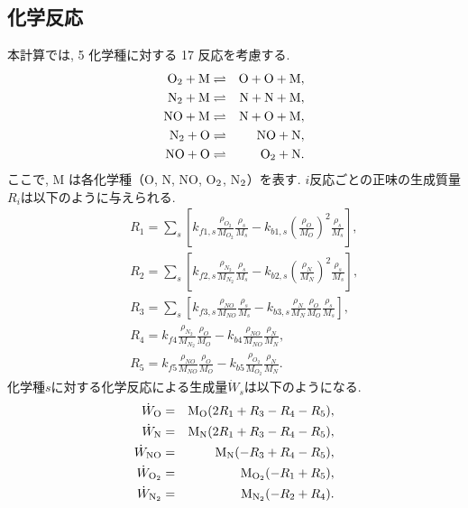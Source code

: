 \subsection*{化学反応}
本計算では,
5 化学種に対する 17 反応を考慮する.　
\begin{eqnarray}
{\rm O}_2+{\rm M} & \rightleftharpoons &  {\rm O}+{\rm O}+{\rm M}, \\
{\rm N}_2+{\rm M} & \rightleftharpoons &  {\rm N}+{\rm N}+{\rm M}, \\
{\rm NO}+{\rm M}  & \rightleftharpoons &  {\rm N}+{\rm O}+{\rm M}, \\
{\rm N}_2+{\rm O} & \rightleftharpoons &  {\rm NO}+{\rm N}, \\
{\rm NO}+{\rm O}  & \rightleftharpoons &  {\rm O}_2+{\rm N}.
\end{eqnarray}
ここで,
M は各化学種（O, N, NO, O$_{\rm 2}$, N$_{\rm 2}$）を表す.
$i$反応ごとの正味の生成質量$R_i$は以下のように与えられる.
\begin{eqnarray}
&&R_1=\sum_{s} \left[ k_{f1,s} \frac{\rho_{O_2}}{M_{O_2}} \frac{\rho_{s}}{M_{s}} -k_{b1,s} \left( \frac{\rho_{O}}{M_{O}} \right) ^2 \frac{\rho_{s}}{M_{s}} \right],\\
&&R_2=\sum_{s} \left[ k_{f2,s} \frac{\rho_{N_2}}{M_{N_2}} \frac{\rho_{s}}{M_{s}} -k_{b2,s} \left( \frac{\rho_{N}}{M_{N}} \right) ^2 \frac{\rho_{s}}{M_{s}} \right],\\
&&R_3=\sum_{s} \left[ k_{f3,s} \frac{\rho_{NO}}{M_{NO}} \frac{\rho_{s}}{M_{s}} -k_{b3,s} \frac{\rho_{N}}{M_{N}} \frac{\rho_{O}}{M_{O}} \frac{\rho_{s}}{M_{s}} \right],\\
&&R_4=k_{f4} \frac{\rho_{N_2}}{M_{N_2}} \frac{\rho_{O}}{M_{O}} -k_{b4} \frac{\rho_{NO}}{M_{NO}} \frac{\rho_{N}}{M_{N}},\\
&&R_5=k_{f5} \frac{\rho_{NO}}{M_{NO}} \frac{\rho_{O}}{M_{O}} -k_{b5} \frac{\rho_{O_2}}{M_{O_2}} \frac{\rho_{N}}{M_{N}}.
\end{eqnarray}
化学種$s$に対する化学反応による生成量${\dot W}_s$は以下のようになる.
\begin{eqnarray}
{\dot W}_{\rm O} &=& {\rm M}_{\rm O}(2R_1+R_3-R_4-R_5),\\
{\dot W}_{\rm N} &=& {\rm M}_{\rm N}(2R_1+R_3-R_4-R_5),\\
{\dot W}_{\rm NO} &=& {\rm M}_{\rm N}(-R_3+R_4-R_5),\\
{\dot W}_{\rm O_{2}} &=& {\rm M}_{\rm O_{2}}(-R_1+R_5),\\
{\dot W}_{\rm N_{2}} &=& {\rm M}_{\rm N_{2}}(-R_2+R_4).
\end{eqnarray}
